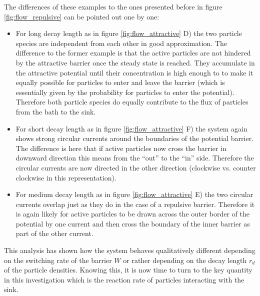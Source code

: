 The differences of these examples to the ones presented before in figure \ref{fig:flow_repulsive} can be pointed out one by one:
\begin{itemize}
    \item For long decay length as in figure \ref{fig:flow_attractive} D) the two particle species are independent from each other in good approximation. The difference to the former example is that the active particles are not hindered by the attractive barrier once the steady state is reached. They accumulate in the attractive potential until their concentration is high enough to to make it equally possible for particles to enter and leave the barrier (which is essentially given by the probability for particles to enter the potential). Therefore both particle species do equally contribute to the flux of particles from the bath to the sink.
    \item For short decay length as in figure \ref{fig:flow_attractive} F) the system again shows strong circular currents around the boundaries of the potential barrier. The difference is here that if active particles now cross the barrier in downward direction this means from the ``out'' to the ``in'' side. Therefore the circular currents are now directed in the other direction (clockwise vs. counter clockwise in this representation).
    \item For medium decay length as in figure \ref{fig:flow_attractive} E)  the two circular currents overlap just as they do in the case of a repulsive barrier. Therefore it is again likely for active particles to be drawn across the outer border of the potential by one current and then cross the boundary of the inner barrier as part of the other current.
\end{itemize}
This analysis has shown how the system behaves qualitatively different depending on the switching rate of the barrier $W$ or rather depending on the decay length $r_d$ of the particle densities. Knowing this, it is now time to turn to the key quantity in this investigation which is the reaction rate of particles interacting with the sink. 

